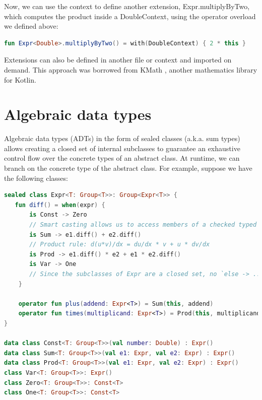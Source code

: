 \documentclass[12pt,initial,twoside,maitrise]{dms}
\numberwithin{equation}{section}
\numberwithin{table}{chapter}
\numberwithin{figure}{chapter}
\begin{document}
Now, we can use the context to define another extension, Expr.multiplyByTwo, which computes the product inside a DoubleContext, using the operator overload we defined above:

\begin{lstlisting}[caption={Simple code listing.}, language=Kotlin]
fun Expr<Double>.multiplyByTwo() = with(DoubleContext) { 2 * this }
\end{lstlisting}

Extensions can also be defined in another file or context and imported on demand. This approach was borrowed from KMath \cite{nozik2019acat}, another mathematics library for Kotlin.

\section{Algebraic data types}\label{sec:algebraic-data-types}

Algebraic data types (ADTs) in the form of sealed classes (a.k.a. sum types) allows creating a closed set of internal subclasses to guarantee an exhaustive control flow over the concrete types of an abstract class. At runtime, we can branch on the concrete type of the abstract class. For example, suppose we have the following classes:

\begin{lstlisting}[caption={Users are forced to handle all subclasses when branching on the type of a sealed class, as incomplete control flow will not compile (instead of say, failing silently at runtime).}, language=Kotlin]
sealed class Expr<T: Group<T>>: Group<Expr<T>> {
   fun diff() = when(expr) {
       is Const -> Zero
       // Smart casting allows us to access members of a checked typed without explicit casting
       is Sum -> e1.diff() + e2.diff()
       // Product rule: d(u*v)/dx = du/dx * v + u * dv/dx
       is Prod -> e1.diff() * e2 + e1 * e2.diff()
       is Var -> One
       // Since the subclasses of Expr are a closed set, no `else -> ...` is required.
    }

    operator fun plus(addend: Expr<T>) = Sum(this, addend)
    operator fun times(multiplicand: Expr<T>) = Prod(this, multiplicand)
}

data class Const<T: Group<T>>(val number: Double) : Expr()
data class Sum<T: Group<T>>(val e1: Expr, val e2: Expr) : Expr()
data class Prod<T: Group<T>>(val e1: Expr, val e2: Expr) : Expr()
class Var<T: Group<T>>: Expr()
class Zero<T: Group<T>>: Const<T>
class One<T: Group<T>>: Const<T>
\end{lstlisting}
\end{document}
